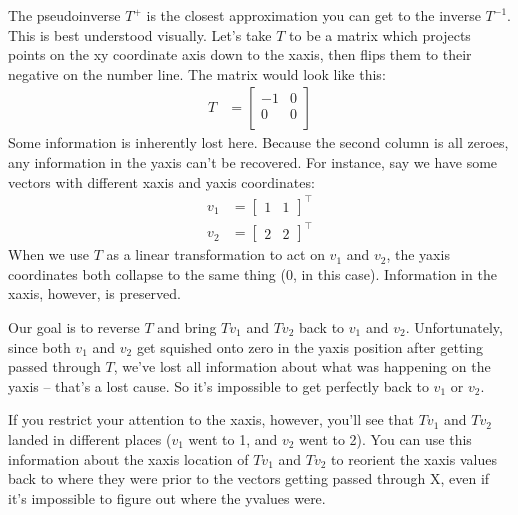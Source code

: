 \documentclass[letterpaper,10pt,english]{jupyterBook}
\begin{document}
\sphinxAtStartPar
The pseudoinverse \(T^+\) is the closest approximation you can get to the inverse \(T^{-1}\). This is best understood visually. Let’s take \(T\) to be a matrix which projects points on the x\sphinxhyphen{}y coordinate axis down to the x\sphinxhyphen{}axis, then flips them to their negative on the number line. The matrix would look like this:
\begin{align*}
    T &=
    \begin{bmatrix}
    -1 & 0 \\
    0 & 0  \\
    \end{bmatrix}
\end{align*}
\sphinxAtStartPar
Some information is inherently lost here. Because the second column is all zeroes, any information in the y\sphinxhyphen{}axis can’t be recovered. For instance, say we have some vectors with different x\sphinxhyphen{}axis and y\sphinxhyphen{}axis coordinates:
\begin{align*}
    v_1 &= \begin{bmatrix} 1 & 1 \end{bmatrix}^\top \\
    v_2 &= \begin{bmatrix} 2 & 2 \end{bmatrix}^\top
\end{align*}
\sphinxAtStartPar
When we use \(T\) as a linear transformation to act on \(v_1\) and \(v_2\), the y\sphinxhyphen{}axis coordinates both collapse to the same thing (0, in this case). Information in the x\sphinxhyphen{}axis, however, is preserved.

\noindent{}

\sphinxAtStartPar
Our goal is to reverse \(T\) and bring \(Tv_1\) and \(Tv_2\) back to \(v_1\) and \(v_2\). Unfortunately, since both \(v_1\) and \(v_2\) get squished onto zero in the y\sphinxhyphen{}axis position after getting passed through \(T\), we’ve lost all information about what was happening on the y\sphinxhyphen{}axis – that’s a lost cause. So it’s impossible to get perfectly back to \(v_1\) or \(v_2\).

\sphinxAtStartPar
If you restrict your attention to the x\sphinxhyphen{}axis, however, you’ll see that \(Tv_1\) and \(Tv_2\) landed in different places (\(v_1\) went to \sphinxhyphen{}1, and \(v_2\) went to \sphinxhyphen{}2). You can use this information about the x\sphinxhyphen{}axis location of \(Tv_1\) and \(Tv_2\) to re\sphinxhyphen{}orient the x\sphinxhyphen{}axis values back to where they were prior to the vectors getting passed through X, even if it’s impossible to figure out where the y\sphinxhyphen{}values were.
\end{document}
